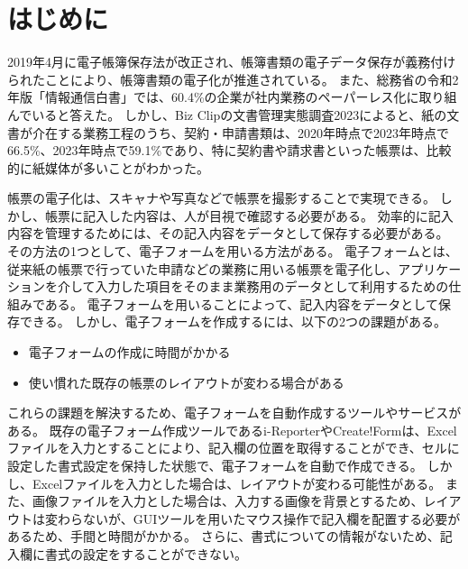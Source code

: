\chapter{はじめに}\label{cha:Introduction}
2019年4月に電子帳簿保存法が改正され、帳簿書類の電子データ保存が義務付けられたことにより、帳簿書類の電子化が推進されている\cite{電子帳簿保存法}。
また、総務省の令和2年版「情報通信白書」では、60.4\%の企業が社内業務のペーパーレス化に取り組んでいると答えた\cite{デジタルデータの経済的価値の計測と活用の現状に関する調査研究}。
しかし、Biz Clipの文書管理実態調査2023によると、紙の文書が介在する業務工程のうち、契約・申請書類は、2020年時点で2023年時点で66.5\%、2023年時点で59.1\%であり、特に契約書や請求書といった帳票は、比較的に紙媒体が多いことがわかった\cite{文書管理実態調査2023}。

帳票の電子化は、スキャナや写真などで帳票を撮影することで実現できる。
しかし、帳票に記入した内容は、人が目視で確認する必要がある。
効率的に記入内容を管理するためには、その記入内容をデータとして保存する必要がある。
その方法の1つとして、電子フォームを用いる方法がある。
電子フォームとは、従来紙の帳票で行っていた申請などの業務に用いる帳票を電子化し、アプリケーションを介して入力した項目をそのまま業務用のデータとして利用するための仕組みである\cite{電子フォーム}。
電子フォームを用いることによって、記入内容をデータとして保存できる。
しかし、電子フォームを作成するには、以下の2つの課題がある。

\begin{itemize}
    \item 電子フォームの作成に時間がかかる
    \item 使い慣れた既存の帳票のレイアウトが変わる場合がある
\end{itemize}

これらの課題を解決するため、電子フォームを自動作成するツールやサービスがある。
既存の電子フォーム作成ツールであるi-Reporter\cite{i-Reporter}やCreate!Form\cite{Create!Form}は、Excelファイルを入力とすることにより、記入欄の位置を取得することができ、セルに設定した書式設定を保持した状態で、電子フォームを自動で作成できる。
しかし、Excelファイルを入力とした場合は、レイアウトが変わる可能性がある。
また、画像ファイルを入力とした場合は、入力する画像を背景とするため、レイアウトは変わらないが、GUIツールを用いたマウス操作で記入欄を配置する必要があるため、手間と時間がかかる。
さらに、書式についての情報がないため、記入欄に書式の設定をすることができない。

